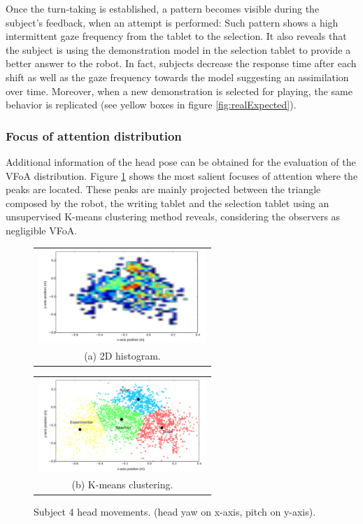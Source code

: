 \documentclass{sig-alternate}
\begin{document}
Once the turn-taking is established, a pattern becomes visible during the
subject's feedback, when an attempt is performed: Such pattern shows a high
intermittent gaze frequency from the tablet to the selection. It also reveals
that the subject is using the demonstration model in the selection tablet to
provide a better answer to the robot. In fact, subjects decrease the response
time after each shift as well as the gaze frequency towards the model suggesting
an assimilation over time. Moreover, when a new demonstration is selected for
playing, the same behavior is replicated (see yellow boxes in figure
\ref{fig:realExpected}).

\subsubsection{Focus of attention distribution}

Additional information of the head pose can be obtained for the evaluation of
the VFoA distribution. Figure \ref{fig:heatmap} shows the most salient focuses
of attention where the peaks are located. These peaks are mainly projected
between the triangle composed by the robot, the writing tablet and the selection
tablet using an unsupervised K-means clustering method reveals, considering the
observers as negligible VFoA.

\begin{figure}[th!]
  \centering
  \begin{tabular}{@{}c@{}}
    \includegraphics[width=.7\linewidth,height=100pt]{heatmap} \\
    \small (a)  2D histogram.
  \end{tabular}

  \vspace{\floatsep}

  \begin{tabular}{@{}c@{}}
    \includegraphics[width=.7\linewidth,height=100pt]{kmeans} \\
    \small (b) K-means clustering.
  \end{tabular}

  \caption{ \small Subject 4 head movements. (head yaw on x-axis, pitch on y-axis).}
  \label{fig:heatmap}
\end{figure}
\end{document}
